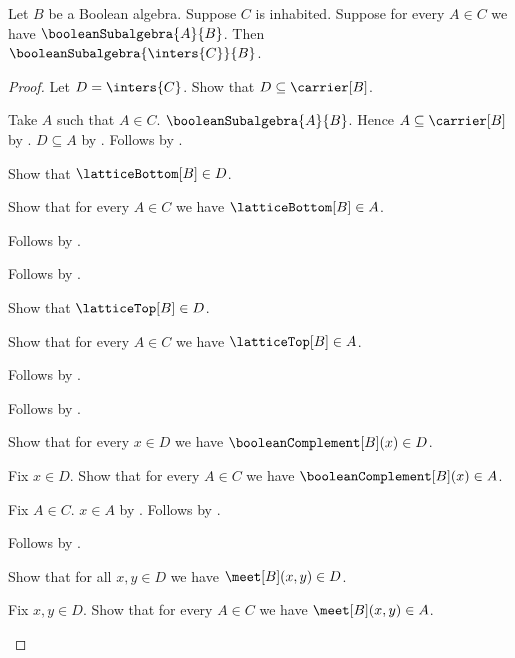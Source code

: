 \begin{theorem}\label{boolean_subalgebra_family_intersection}
    Let $B$ be a Boolean algebra.
    Suppose $C$ is inhabited.
    Suppose for every $A\in C$ we have $\booleanSubalgebra{A}{B}$.
    Then $\booleanSubalgebra{\inters{C}}{B}$.
\end{theorem}
\begin{proof}
    Let $D=\inters{C}$.
    Show that $D\subseteq\carrier[B]$.
    \begin{subproof}
        Take $A$ such that $A\in C$.
        $\booleanSubalgebra{A}{B}$.
        Hence $A\subseteq\carrier[B]$ by
            .
        $D\subseteq A$ by .
        Follows by .
    \end{subproof}
    Show that $\latticeBottom[B]\in D$.
    \begin{subproof}
        Show that for every $A\in C$ we have
            $\latticeBottom[B]\in A$.
        \begin{subproof}
            Follows by .
        \end{subproof}
        Follows by .
    \end{subproof}
    Show that $\latticeTop[B]\in D$.
    \begin{subproof}
        Show that for every $A\in C$ we have $\latticeTop[B]\in A$.
        \begin{subproof}
            Follows by .
        \end{subproof}
        Follows by .
    \end{subproof}
    Show that for every $x\in D$ we have
        $\booleanComplement[B](x)\in D$.
    \begin{subproof}
        Fix $x\in D$.
        Show that for every $A\in C$ we have
            $\booleanComplement[B](x)\in A$.
        \begin{subproof}
            Fix $A\in C$.
            $x\in A$ by .
            Follows by .
        \end{subproof}
        Follows by .
    \end{subproof}
    Show that for all $x,y\in D$ we have $\meet[B](x,y)\in D$.
    \begin{subproof}
        Fix $x,y\in D$.
        Show that for every $A\in C$ we have $\meet[B](x,y)\in A$.
        \begin{subproof}

\end{subproof}
\end{subproof}
\end{proof}
